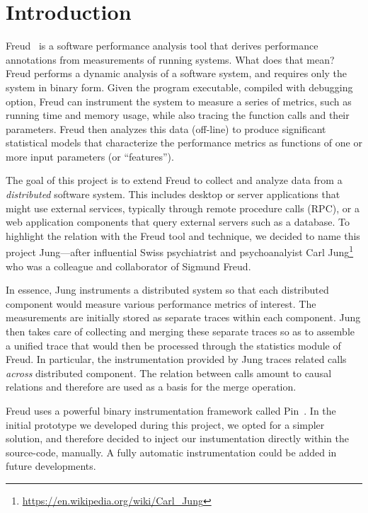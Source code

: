 \chapter{Introduction}

Freud~\cite{freud} is a software performance analysis tool that
derives performance annotations from measurements of running
systems. What does that mean?  Freud performs a dynamic analysis of a
software system, and requires only the system in binary form.  Given
the program executable, compiled with debugging option, Freud can
instrument the system to measure a series of metrics, such as running
time and memory usage, while also tracing the function calls and their
parameters. Freud then analyzes this data (off-line) to produce
significant statistical models that characterize the performance
metrics as functions of one or more input parameters (or
``features'').


The goal of this project is to extend Freud to collect and analyze
data from a \emph{distributed} software system.  This includes desktop
or server applications that might use external services, typically
through remote procedure calls (RPC), or a web application components
that query external servers such as a database.  To highlight the
relation with the Freud tool and technique, we decided to name this
project Jung---after influential Swiss psychiatrist and psychoanalyist
Carl Jung\footnote{\url{https://en.wikipedia.org/wiki/Carl_Jung}} who
was a colleague and collaborator of Sigmund Freud.

In essence, Jung instruments a distributed system so that each
distributed component would measure various performance metrics of
interest.  The measurements are initially stored as separate traces
within each component.  Jung then takes care of collecting and merging
these separate traces so as to assemble a unified trace that would
then be processed through the statistics module of Freud.  In
particular, the instrumentation provided by Jung traces related calls
\emph{across} distributed component.  The relation between calls
amount to causal relations and therefore are used as a basis for the
merge operation.

Freud uses a powerful binary instrumentation framework called
Pin~\cite{PIN}.  In the initial prototype we developed during this
project, we opted for a simpler solution, and therefore decided to
inject our instumentation directly within the source-code, manually.
A fully automatic instrumentation could be added in future
developments.


